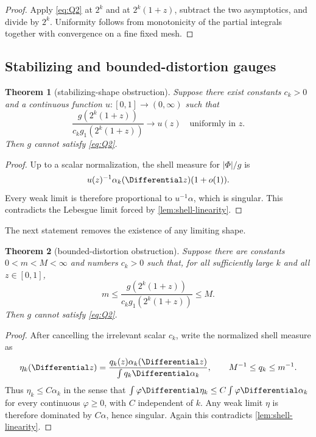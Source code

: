 \documentclass[11pt,oneside]{article}
\newtheorem{theorem}{Theorem}[section]
\theoremstyle{definition}
\theoremstyle{remark}
\begin{document}
\begin{proof}
Apply \eqref{eq:Q2} at \(2^k\) and at \(2^k(1+z)\), subtract the two
asymptotics, and divide by \(2^k\).  Uniformity follows from monotonicity of
the partial integrals together with convergence on a fine fixed mesh.
\end{proof}

\subsection{Stabilizing and bounded-distortion gauges}

\begin{theorem}[stabilizing-shape obstruction]
\label{thm:stabilizing-obstruction}
Suppose there exist constants \(c_k>0\) and a continuous function
\(u:[0,1]\to(0,\infty)\) such that
\begin{equation}
 \frac{g(2^k(1+z))}{c_kg_1(2^k(1+z))}\longrightarrow u(z)
 \quad\text{uniformly in }z.
 \label{eq:stabilizing}
\end{equation}
Then \(g\) cannot satisfy \eqref{eq:Q2}.
\end{theorem}

\begin{proof}
Up to a scalar normalization, the shell measure for \(|\Phi|/g\) is
\[
 u(z)^{-1}\alpha_k(\Differential z)(1+o(1)).
\]
Every weak limit is therefore proportional to
\(u^{-1}\alpha\), which is singular.  This contradicts the Lebesgue limit
forced by \cref{lem:shell-linearity}.
\end{proof}

The next statement removes the existence of any limiting shape.

\begin{theorem}[bounded-distortion obstruction]
\label{thm:bounded-distortion}
Suppose there are constants \(0<m<M<\infty\) and numbers \(c_k>0\) such
that, for all sufficiently large \(k\) and all \(z\in[0,1]\),
\begin{equation}
 m\le
 \frac{g(2^k(1+z))}{c_kg_1(2^k(1+z))}
 \le M.
 \label{eq:bounded-distortion}
\end{equation}
Then \(g\) cannot satisfy \eqref{eq:Q2}.
\end{theorem}

\begin{proof}
After cancelling the irrelevant scalar \(c_k\), write the normalized shell
measure as
\[
 \eta_k(\Differential z)=\frac{q_k(z)\alpha_k(\Differential z)}{\int q_k\Differential\alpha_k},
 \qquad M^{-1}\le q_k\le m^{-1}.
\]
Thus \(\eta_k\le C\alpha_k\) in the sense that
\(\int\varphi\Differential\eta_k\le C\int\varphi\Differential\alpha_k\) for every
continuous \(\varphi\ge0\), with \(C\) independent of \(k\).  Any weak
limit \(\eta\) is therefore dominated by \(C\alpha\), hence singular.
Again this contradicts \cref{lem:shell-linearity}.
\end{proof}
\end{document}
